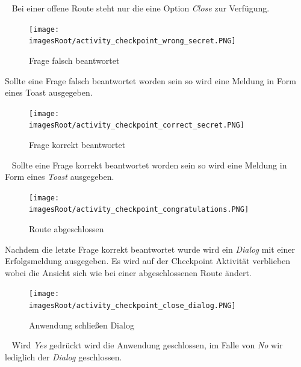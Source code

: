 \documentclass[11pt, a4paper, twoside]{article}   	%
\newcommand{\imagesRoot}{images}
\begin{document}
\ \newline
Bei einer offene Route steht nur die eine Option \emph{Close} zur Verfügung.
\newpage
\begin{figure}[h]
	\centering
	\texttt{[image: \\imagesRoot/activity\_checkpoint\_wrong\_secret.PNG]}
	\caption
	{Frage falsch beantwortet}
\end{figure}
Sollte eine Frage falsch beantwortet worden sein so wird eine Meldung in Form eines Toast ausgegeben.
\begin{figure}[h]
	\centering
	\texttt{[image: \\imagesRoot/activity\_checkpoint\_correct\_secret.PNG]}
	\caption
	{Frage korrekt beantwortet}
\end{figure}
\ \newline
Sollte eine Frage korrekt beantwortet worden sein so wird eine Meldung in Form eines \emph{Toast} ausgegeben.
\ \newline
\newpage
\begin{figure}[h]
	\centering
	\texttt{[image: \\imagesRoot/activity\_checkpoint\_congratulations.PNG]}
	\caption
	{Route abgeschlossen}
\end{figure}
Nachdem die letzte Frage korrekt beantwortet wurde  wird ein \emph{Dialog} mit einer Erfolgsmeldung ausgegeben. Es wird auf der Checkpoint Aktivität verblieben wobei die Ansicht sich wie bei einer abgeschlossenen Route ändert.
\newline
\begin{figure}[h]
	\centering
	\texttt{[image: \\imagesRoot/activity\_checkpoint\_close\_dialog.PNG]}
	\caption
	{Anwendung schließen Dialog}
\end{figure}
\ \newline
Wird \emph{Yes} gedrückt wird die Anwendung geschlossen, im Falle von \emph{No} wir lediglich der \emph{Dialog} geschlossen.
\end{document}
